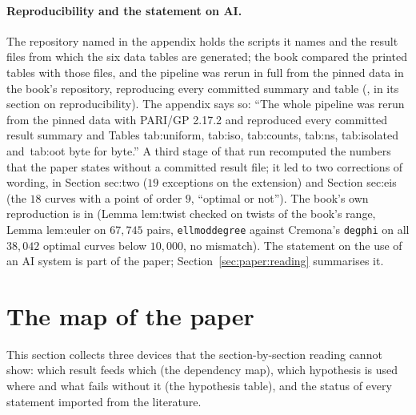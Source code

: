 \begin{sloppypar}
\paragraph{Reproducibility and the statement on AI.} The repository named in the appendix holds the scripts it names and the result files from which the six
data tables are generated; the book compared the printed tables with those files, and the pipeline was rerun in full from the pinned data in the book's
repository, reproducing every committed summary and table (, in its section on reproducibility). The appendix says so: ``The whole pipeline was rerun from the pinned data with PARI/GP 2.17.2 and reproduced every committed result summary and Tables tab:uniform, tab:iso, tab:counts, tab:ns, tab:isolated and~tab:oot byte for byte.'' A
third stage of that run recomputed the numbers that the paper states without a committed result file; it led to two corrections of wording, in Section
sec:two ($19$ exceptions on the extension) and Section sec:eis (the $18$ curves with a point of order $9$, ``optimal or not''). The
book's own reproduction is in
 (Lemma lem:twist checked on twists of the book's range, Lemma lem:euler on $67{,}745$ pairs, \texttt{ellmoddegree} against Cremona's \texttt{degphi} on all $38{,}042$ optimal curves below
$10{,}000$, no mismatch). The statement on the use of an AI system is part of the paper; Section~\ref{sec:paper:reading} summarises it.

\section{The map of the paper}\label{sec:paper:map}

This section collects three devices that the section-by-section reading cannot show: which result feeds which (the dependency map), which hypothesis is used
where and what fails without it (the hypothesis table), and the status of every statement imported from the literature.


\end{sloppypar}
